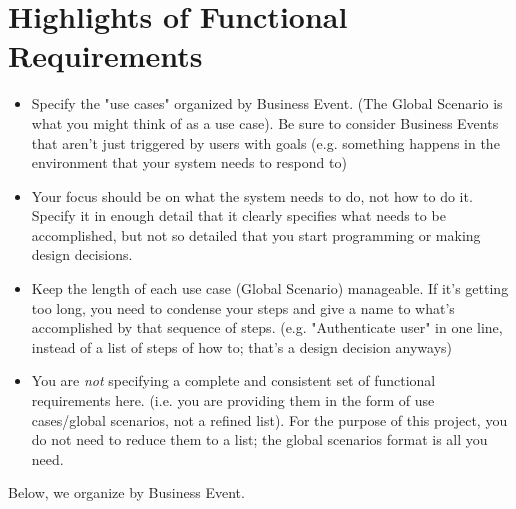 \documentclass[]{article}
\begin{document}
\section{Highlights of Functional Requirements}
\label{sec:functional_requirements}
\begin{itemize}
	\item Specify the "use cases" organized by Business Event. (The Global Scenario is what you might think of as a use case). Be sure to consider Business Events that aren't just triggered by users with goals (e.g. something happens in the environment that your system needs to respond to)
	\item Your focus should be on what the system needs to do, not how to do it. Specify it in enough detail that it clearly specifies what needs to be accomplished, but not so detailed that you start programming or making design decisions.
	\item Keep the length of each use case (Global Scenario) manageable. If it's getting too long, you need to condense your steps and give a name to what's accomplished by that sequence of steps. (e.g. "Authenticate user" in one line, instead of a list of steps of how to; that's a design decision anyways)
	\item You are \emph{not} specifying a complete and consistent set of functional requirements here. (i.e. you are providing them in the form of use cases/global scenarios, not a refined list). For the purpose of this project, you do not need to reduce them to a list; the global scenarios format is all you need.
\end{itemize}
	Below, we organize by Business Event.
\end{document}
